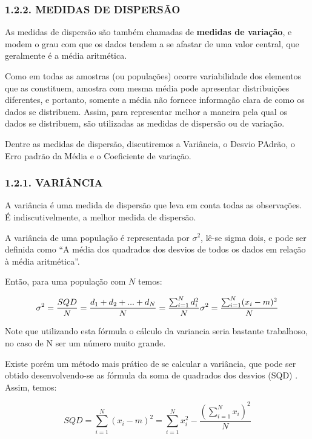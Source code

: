 \documentclass[
]{article}
\begin{document}
\hypertarget{medidas-de-dispersuxe3o}{%
\subsubsection{1.2.2. MEDIDAS DE
DISPERSÃO}\label{medidas-de-dispersuxe3o}}

As medidas de dispersão são também chamadas de \textbf{medidas de
variação}, e modem o grau com que os dados tendem a se afastar de uma
valor central, que geralmente é a média aritmética.

Como em todas as amostras (ou populações) ocorre variabilidade dos
elementos que as constituem, amostra com mesma média pode apresentar
distribuições diferentes, e portanto, somente a média não fornece
informação clara de como os dados se distribuem. Assim, para representar
melhor a maneira pela qual os dados se distribuem, são utilizadas as
medidas de dispersão ou de variação.

Dentre as medidas de dispersão, discutiremos a Variância, o Desvio
PAdrão, o Erro padrão da Média e o Coeficiente de variação.

\hypertarget{variuxe2ncia}{%
\subsubsection{1.2.1. VARIÂNCIA}\label{variuxe2ncia}}

A variância é uma medida de dispersão que leva em conta todas as
observações. É indiscutivelmente, a melhor medida de dispersão.

A variância de uma população é representada por \(\sigma^2\), lê-se
sigma dois, e pode ser definida como ``A média dos quadrados dos desvios
de todos os dados em relação à média aritmética''.

Então, para uma população com \(N\) temos:

\[
\sigma^2 = \frac{SQD}{N} = \frac{d_1+d_2+...+d_N}{N} =\frac{\sum_{i=1}^Nd_i^2}{N} \\
\sigma^2 =\frac{\sum_{i=1}^N(x_i-m)^2}{N}
\]

Note que utilizando esta fórmula o cálculo da variancia seria bastante
trabalhoso, no caso de N ser um número muito grande.

Existe porém um método mais prático de se calcular a variância, que pode
ser obtido desenvolvendo-se as fórmula da soma de quadrados dos desvios
(SQD) . Assim, temos:

\[
SQD = \sum_{i=1}^N(x_i-m)^2 = \sum_{i=1}^Nx_i^2-\frac{(\sum_{i=1}^N x_i)^2}{N}
\]
\end{document}
